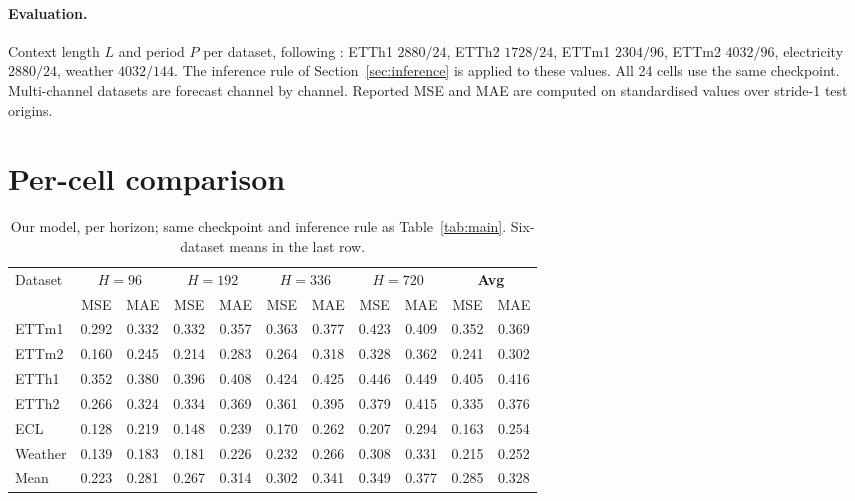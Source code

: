 \paragraph{Evaluation.} Context length $L$ and period $P$ per dataset, following \citet{visionts}:
ETTh1 $2880/24$, ETTh2 $1728/24$, ETTm1 $2304/96$, ETTm2 $4032/96$, electricity $2880/24$, weather
$4032/144$. The inference rule of Section~\ref{sec:inference} is applied to these values. All 24
cells use the same checkpoint. Multi-channel datasets are forecast channel by channel. Reported MSE
and MAE are computed on standardised values over stride-1 test origins.

\section{Per-cell comparison}
\label{app:perhorizon}

\begin{table}[h]
\caption{Our model, per horizon; same checkpoint and inference rule as Table~\ref{tab:main}.
Six-dataset means in the last row.}
\label{tab:perhorizon}
\begin{center}
\setlength{\tabcolsep}{4pt}
\footnotesize
\begin{tabular}{lcccccccccc}
\toprule
\multirow{2}{*}{Dataset} & \multicolumn{2}{c}{$H{=}96$} & \multicolumn{2}{c}{$H{=}192$} & \multicolumn{2}{c}{$H{=}336$} & \multicolumn{2}{c}{$H{=}720$} & \multicolumn{2}{c}{\textbf{Avg}} \\
\cmidrule(lr){2-3} \cmidrule(lr){4-5} \cmidrule(lr){6-7} \cmidrule(lr){8-9} \cmidrule(lr){10-11}
 & MSE & MAE & MSE & MAE & MSE & MAE & MSE & MAE & MSE & MAE \\
\midrule
ETTm1   & 0.292 & 0.332 & 0.332 & 0.357 & 0.363 & 0.377 & 0.423 & 0.409 & 0.352 & 0.369 \\
ETTm2   & 0.160 & 0.245 & 0.214 & 0.283 & 0.264 & 0.318 & 0.328 & 0.362 & 0.241 & 0.302 \\
ETTh1   & 0.352 & 0.380 & 0.396 & 0.408 & 0.424 & 0.425 & 0.446 & 0.449 & 0.405 & 0.416 \\
ETTh2   & 0.266 & 0.324 & 0.334 & 0.369 & 0.361 & 0.395 & 0.379 & 0.415 & 0.335 & 0.376 \\
ECL     & 0.128 & 0.219 & 0.148 & 0.239 & 0.170 & 0.262 & 0.207 & 0.294 & 0.163 & 0.254 \\
Weather & 0.139 & 0.183 & 0.181 & 0.226 & 0.232 & 0.266 & 0.308 & 0.331 & 0.215 & 0.252 \\
\midrule
Mean    & 0.223 & 0.281 & 0.267 & 0.314 & 0.302 & 0.341 & 0.349 & 0.377 & 0.285 & 0.328 \\
\bottomrule
\end{tabular}
\end{center}
\end{table}

